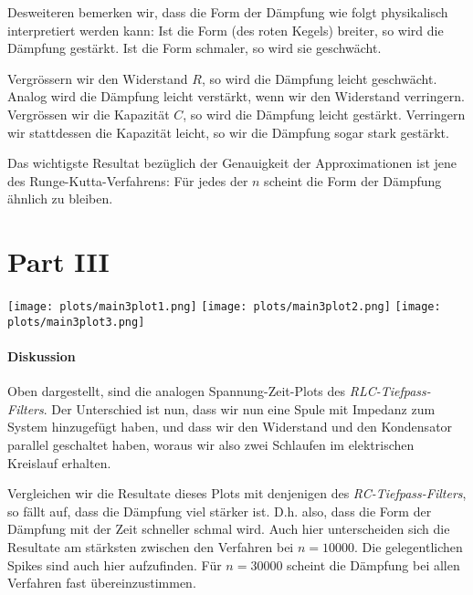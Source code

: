 \documentclass{article}
\begin{document}
Desweiteren bemerken wir, dass die Form der Dämpfung wie folgt physikalisch interpretiert werden kann: Ist die Form (des roten Kegels) breiter, so wird die Dämpfung gestärkt. Ist die Form schmaler, so wird sie geschwächt.

Vergrössern wir den Widerstand $R$, so wird die Dämpfung leicht geschwächt. Analog wird die Dämpfung leicht verstärkt, wenn wir den Widerstand verringern. Vergrössen wir die Kapazität $C$, so wird die Dämpfung leicht gestärkt. Verringern wir stattdessen die Kapazität leicht, so wir die Dämpfung sogar stark gestärkt.

Das wichtigste Resultat bezüglich der Genauigkeit der Approximationen ist jene des Runge-Kutta-Verfahrens: Für jedes der $n$ scheint die Form der Dämpfung ähnlich zu bleiben.


\section*{Part III}
%
\begin{center}
  \texttt{[image: plots/main3plot1.png]}
  \hfill{}
  \texttt{[image: plots/main3plot2.png]}
  \texttt{[image: plots/main3plot3.png]}
\end{center}
\paragraph{Diskussion}
Oben dargestellt, sind die analogen Spannung-Zeit-Plots des \emph{RLC-Tiefpass-Filters}. Der Unterschied ist nun, dass wir nun eine Spule mit Impedanz zum System hinzugefügt haben, und dass wir den Widerstand und den Kondensator parallel geschaltet haben, woraus wir also zwei Schlaufen im elektrischen Kreislauf erhalten.

Vergleichen wir die Resultate dieses Plots mit denjenigen des \emph{RC-Tiefpass-Filters}, so fällt auf, dass die Dämpfung viel stärker ist. D.h. also, dass die Form der Dämpfung mit der Zeit schneller schmal wird. Auch hier unterscheiden sich die Resultate am stärksten zwischen den Verfahren bei $n=10000$. Die gelegentlichen Spikes sind auch hier aufzufinden.
Für $n=30000$ scheint die Dämpfung bei allen Verfahren fast übereinzustimmen.
\end{document}
